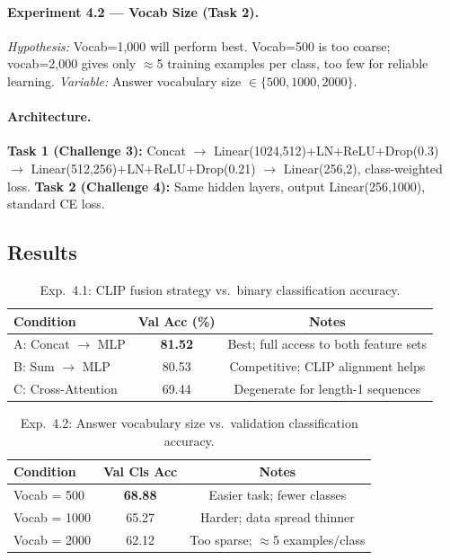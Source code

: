 \documentclass[11pt]{article}
\begin{document}
\paragraph{Experiment 4.2 — Vocab Size (Task 2).}
\textit{Hypothesis:} Vocab=1{,}000 will perform best. Vocab=500 is too coarse; vocab=2{,}000
gives only $\approx$5 training examples per class, too few for reliable learning.
\textit{Variable:} Answer vocabulary size $\in \{500, 1000, 2000\}$.

\paragraph{Architecture.}
\textbf{Task 1 (Challenge 3):} Concat $\to$ Linear(1024,512)+LN+ReLU+Drop(0.3) $\to$
Linear(512,256)+LN+ReLU+Drop(0.21) $\to$ Linear(256,2), class-weighted loss.
\textbf{Task 2 (Challenge 4):} Same hidden layers, output Linear(256,1000), standard CE loss.

\subsection{Results}

\begin{table}[h]
  \centering
  \caption{Exp.\ 4.1: CLIP fusion strategy vs.\ binary classification accuracy.}
  \label{tab:exp41_cls}
  \begin{tabular}{lcc}
    \toprule
    \textbf{Condition} & \textbf{Val Acc (\%)} & \textbf{Notes} \\
    \midrule
    A: Concat $\to$ MLP    & \textbf{81.52} & Best; full access to both feature sets \\
    B: Sum $\to$ MLP       & 80.53 & Competitive; CLIP alignment helps \\
    C: Cross-Attention     & 69.44 & Degenerate for length-1 sequences \\
    \bottomrule
  \end{tabular}
\end{table}

\begin{table}[h]
  \centering
  \caption{Exp.\ 4.2: Answer vocabulary size vs.\ validation classification accuracy.}
  \label{tab:exp42_gen}
  \begin{tabular}{lcc}
    \toprule
    \textbf{Condition} & \textbf{Val Cls Acc} & \textbf{Notes} \\
    \midrule
    Vocab = 500  & \textbf{68.88} & Easier task; fewer classes \\
    Vocab = 1000 & 65.27 & Harder; data spread thinner \\
    Vocab = 2000 & 62.12 & Too sparse; $\approx$5 examples/class \\
    \bottomrule
  \end{tabular}
\end{table}
\end{document}
